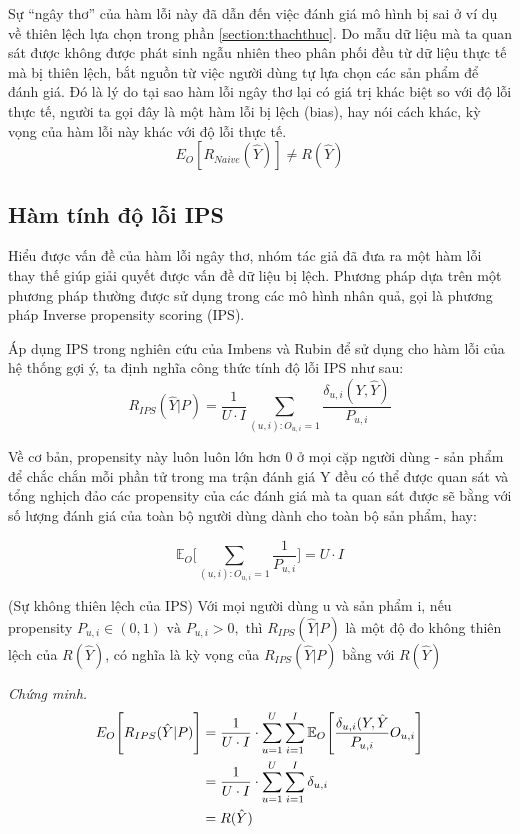 Sự ``ngây thơ'' của hàm lỗi này đã dẫn đến việc đánh giá mô hình bị sai ở ví dụ về thiên lệch lựa chọn trong phần \ref{section:thachthuc}. Do mẫu dữ liệu mà ta quan sát được không được phát sinh ngẫu nhiên theo phân phối đều từ dữ liệu thực tế mà bị thiên lệch, bắt nguồn từ việc người dùng tự lựa chọn các sản phẩm để đánh giá. Đó là lý do tại sao hàm lỗi ngây thơ lại có giá trị khác biệt so với độ lỗi thực tế, người ta gọi đây là một hàm lỗi bị lệch (bias), hay nói cách khác, kỳ vọng của hàm lỗi này khác với độ lỗi thực tế.
\[E_O [R_{Naive} (\hat{Y})] \ne R(\hat{Y})\]

\subsection{Hàm tính độ lỗi IPS}
Hiểu được vấn đề của hàm lỗi ngây thơ, nhóm tác giả đã đưa ra một hàm lỗi thay thế giúp giải quyết được vấn đề dữ liệu bị lệch. Phương pháp dựa trên một phương pháp thường được sử dụng trong các mô hình nhân quả, gọi là phương pháp Inverse propensity scoring (IPS). 

Áp dụng IPS trong nghiên cứu của Imbens và Rubin \cite{imbens_rubin_2015} để sử dụng cho hàm lỗi của hệ thống gợi ý, ta định nghĩa công thức tính độ lỗi IPS như sau:
\begin{equation}
\label{eq:IPS}
R_{IPS}(\hat{Y}|P) = \frac{1}{U\cdot I}\sum_{(u,i):O_{u,i}=1} \frac{\delta_{u,i}(Y,\hat{Y})}{P_{u,i}}
\end{equation}

Về cơ bản, propensity này luôn luôn lớn hơn 0 ở mọi cặp người dùng - sản phẩm để chắc chắn mỗi phần tử trong ma trận đánh giá Y đều có thể được quan sát và tổng nghịch đảo các propensity của các đánh giá mà ta quan sát được sẽ bằng với số lượng đánh giá của toàn bộ người dùng dành cho toàn bộ sản phẩm, hay:

\begin{equation}
\label{eq:EO}
\mathbb{E}_{O}\bigg[\sum_{(u,i):O_{u,i}=1} \frac{1}{P_{u,i}}\bigg] = U \cdot I
\end{equation}

\begin{lemma}
(Sự không thiên lệch của IPS)
Với mọi người dùng u và sản phẩm i, nếu propensity $P_{u,i} \in (0,1)\text{ và }  P_{u,i}>0, \text{ thì }  R_{IPS}(\hat{Y}|P)$ là một độ đo không thiên lệch của $R(\hat{Y})$, có nghĩa là kỳ vọng của $R_{IPS}(\hat{Y}|P)$ bằng với $R(\hat{Y})$
\end{lemma}

\textit{Chứng minh.} 
\begin{equation}
\begin{aligned}
\mathcal\mathbb{E}_{O} \Bigg[R_{IPS}(\hat{Y}|P)\Bigg] &=  \frac{1}{U\cdot I} \cdot \sum_{u=1}^{U} \sum_{i=1}^{I} \mathbb{E}_{O} \Bigg[ \frac{\delta_{u,i}(Y,\hat{Y}}{P_{u,i}}{O_{u,i}}\Bigg] \\ &= \frac{1}{U\cdot I} \cdot \sum_{u=1}^{U} \sum_{i=1}^{I}\delta_{u,i} \\ &
= R(\hat{Y})
\end{aligned}
\end{equation}

